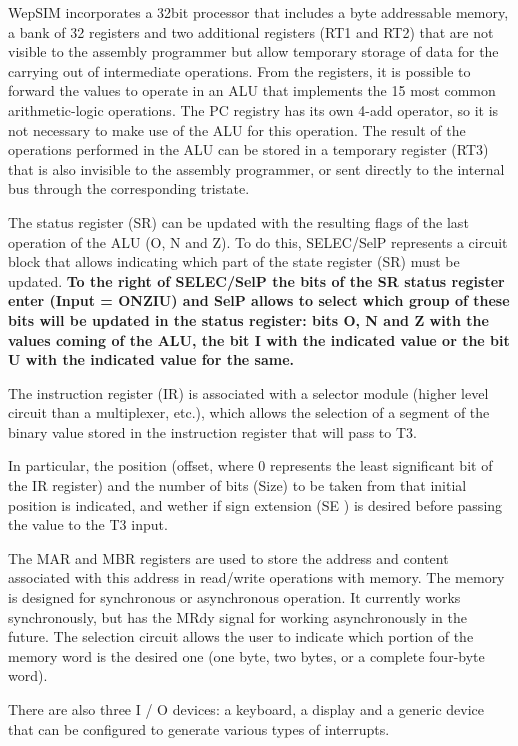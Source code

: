 WepSIM incorporates a 32bit processor that includes a byte addressable memory,  a bank of 32 registers and two additional registers (RT1 and RT2) that are not visible to the assembly programmer but allow temporary storage of data for the carrying out of intermediate operations. From the registers, it is possible to forward the values to operate in an ALU that implements the 15 most common arithmetic-logic operations. The PC registry has its own 4-add operator, so it is not necessary to make use of the ALU for this operation. The result of the operations performed in the ALU can be stored in a temporary register (RT3) that is also invisible to the assembly programmer, or sent directly to the internal bus through the corresponding tristate.


The status register (SR) can be updated with the resulting flags of the last operation of the ALU (O, N and Z). To do this, SELEC/SelP represents a circuit block that allows indicating which part of the state register (SR) must be updated. \textbf{To the right of SELEC/SelP the bits of the SR status register enter (Input = ONZIU) and SelP allows to select which group of these bits will be updated in the status register: bits O, N and Z with the values coming of the ALU, the bit I with the indicated value or the bit U with the indicated value for the same.}

The instruction register (IR) is associated with a selector module (higher level circuit than a multiplexer, etc.), which allows the selection of a segment of the binary value stored in the instruction register that will pass to T3.

In particular, the position (offset, where 0 represents the least significant bit of the IR register) and the number of bits (Size) to be taken from that initial position is indicated, and wether if sign extension (SE ) is desired before passing the value to the T3 input.

The MAR and MBR registers are used to store the address and content associated with this address in read/write operations with memory. The memory is designed for synchronous or asynchronous operation. It currently works synchronously, but has the MRdy signal for working asynchronously in the future. The selection circuit allows the user to indicate which portion of the memory word is the desired one (one byte, two bytes, or a complete four-byte word).

There are also three I / O devices: a keyboard, a display and a generic device that can be configured to generate various types of interrupts.

